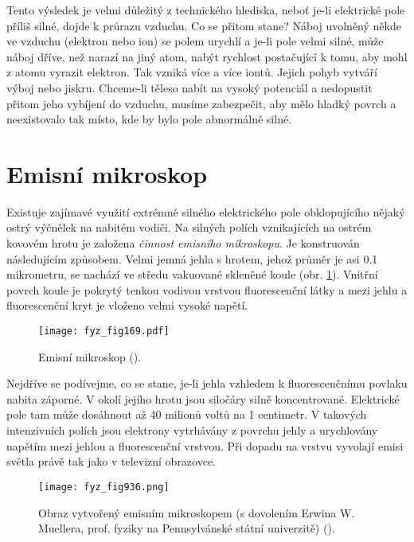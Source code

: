   Tento výsledek je velmi důležitý z technického hlediska, neboť je-li elektrické pole příliš silné,
  dojde k průrazu vzduchu. Co se přitom stane? Náboj uvolněný někde ve vzduchu (elektron nebo ion)
  se polem urychlí a je-li pole velmi silné, může náboj dříve, než narazí na jiný atom, nabýt
  rychlost postačující k tomu, aby mohl z atomu vyrazit elektron. Tak vzniká více a více iontů.
  Jejich pohyb vytváří výboj nebo jiskru. Chceme-li těleso nabít na vysoký potenciál a nedopustit
  přitom jeho vybíjení do vzduchu, musíme zabezpečit, aby mělo hladký povrch a neexistovalo tak
  místo, kde by bylo pole abnormálně silné.
  
\section{Emisní mikroskop}\label{fyz:IIchapVsecXXI}  
  Existuje zajímavé využití extrémně silného elektrického pole obklopujícího nějaký ostrý výčnělek
  na nabitém vodiči. Na silných polích vznikajících na ostrém kovovém hrotu je založena
  \emph{činnost emisního mikroskopu}. Je konstruován následujícím způsobem. Velmi jemná jehla s
  hrotem, jehož průměr je asi \num{0.1} mikrometru, se nachází ve středu vakuované skleněné koule
  (obr. \ref{fyz:fig169}). Vnitřní povrch koule je pokrytý tenkou vodivou vrstvou fluorescenční
  látky a mezi jehlu a fluorescenční kryt je vloženo velmi vysoké napětí.

  \begin{figure}[ht!]  %
    \centering
    \texttt{[image: fyz\_fig169.pdf]}
    \caption{Emisní mikroskop (\cite[s.~118]{Feynman02}).}
    \label{fyz:fig169}
  \end{figure}

  Nejdříve se podívejme, co se stane, je-li jehla vzhledem k fluorescenčnímu povlaku nabita záporné.
  V okolí jejího hrotu jsou siločáry silně koncentrované. Elektrické pole tam může dosáhnout až 40
  milionů voltů na 1 centimetr. V takových intenzivních polích jsou elektrony vytrhávány z povrchu
  jehly a urychlovány napětím mezi jehlou a fluorescenční vrstvou. Při dopadu na vrstvu vyvolají
  emisi světla právě tak jako v televizní obrazovce.

  \begin{figure}[ht!]  %
    \centering
    \texttt{[image: fyz\_fig936.png]}
    \caption{Obraz vytvořený emisním mikroskopem (s dovolením Erwina W. Muellera, prof. fyziky na 
            Pennsylvánské státní univerzitě) (\cite[s.~119]{Feynman02}).}
    \label{fyz:fig936}
  \end{figure}

